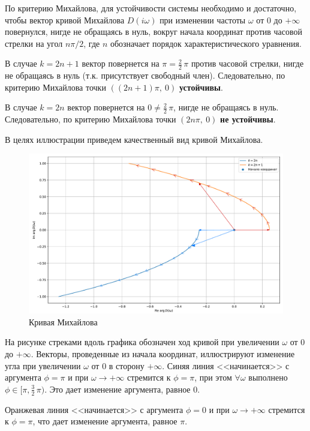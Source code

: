 \documentclass[a4paper,12pt]{article}
\begin{document}
    По критерию Михайлова, для устойчивости системы необходимо и достаточно, чтобы вектор кривой Михайлова $D (i\omega)$ при изменении частоты $\omega$ от $0$ до $+\infty$ повернулся, нигде не обращаясь в нуль, вокруг начала координат против часовой стрелки на угол $n \pi / 2$, где $n$ обозначает порядок характеристического уравнения.

    В случае $k = 2n+1$ вектор повернется на $\pi = \frac{2}{2}\,\pi$ против часовой стрелки, нигде не обращаясь в нуль (т.к. присутствует свободный член). Следовательно, по критерию Михайлова точки ${((2n+1)\pi,~0)}$ \textbf{устойчивы}.

    В случае $k = 2n$ вектор повернется на $0 \neq \frac{2}{2}\,\pi$, нигде не обращаясь в нуль. Следовательно, по критерию Михайлова точки $(2n\pi,~0)$ \textbf{не устойчивы}.

    В целях иллюстрации приведем качественный вид кривой Михайлова.

    \begin{figure}[h]
        \caption{Кривая Михайлова}
        \centering
        \includegraphics[width=\textwidth]{mih.pdf}
    \end{figure}

    На рисунке стреками вдоль графика обозначен ход кривой при увеличении $\omega$ от $0$ до $+\infty$.
    Векторы, проведенные из начала координат, иллюстрируют изменение угла при увеличении $\omega$ от $0$ в сторону $+\infty$.
    Синяя линия <<начинается>> с аргумента $\phi = \pi$ и при $\omega \rightarrow +\infty$ стремится к $\phi = \pi$, при этом $\forall \omega$ выполнено $\phi \in [\pi, \frac{3}{2}\,\pi)$. Это дает изменение аргумента, равное $0$.

    Оранжевая линия <<начинается>> с аргумента $\phi = 0$ и при $\omega \rightarrow +\infty$ стремится к $\phi = \pi$, что дает изменение аргумента, равное $\pi$.
\end{document}
